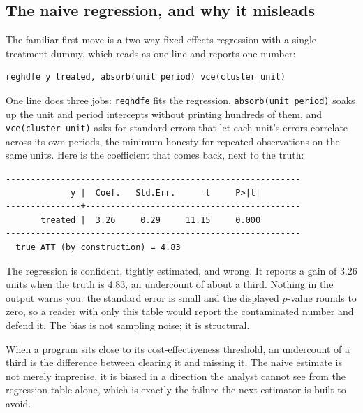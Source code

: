 \documentclass[
    a4paper,
    fontsize=10pt,
    twoside=true,
    numbers=noenddot,
]{kaobook}
\begin{document}
\subsection{The naive regression, and why it misleads}
The familiar first move is a two-way fixed-effects regression with a single treatment dummy, which reads as one line and reports one number:
\par
{\footnotesize
\begin{verbatim}
reghdfe y treated, absorb(unit period) vce(cluster unit)
\end{verbatim}
}
One line does three jobs: \texttt{reghdfe} fits the regression, \texttt{absorb(unit period)} soaks up the unit and period intercepts without printing hundreds of them, and \texttt{vce(cluster unit)} asks for standard errors that let each unit's errors correlate across its own periods, the minimum honesty for repeated observations on the same units. Here is the coefficient that comes back, next to the truth:
\par
{\footnotesize
\begin{verbatim}
-----------------------------------------------------------
             y |  Coef.   Std.Err.      t     P>|t|
---------------+-------------------------------------------
       treated |  3.26     0.29     11.15     0.000
-----------------------------------------------------------
  true ATT (by construction) = 4.83
\end{verbatim}
}
The regression is confident, tightly estimated, and wrong. It reports a gain of 3.26 units when the truth is 4.83, an undercount of about a third. Nothing in the output warns you: the standard error is small and the displayed $p$-value rounds to zero, so a reader with only this table would report the contaminated number and defend it. The bias is not sampling noise; it is structural.

When a program sits close to its cost-effectiveness threshold, an undercount of a third is the difference between clearing it and missing it. The naive estimate is not merely imprecise, it is biased in a direction the analyst cannot see from the regression table alone, which is exactly the failure the next estimator is built to avoid.
\end{document}
